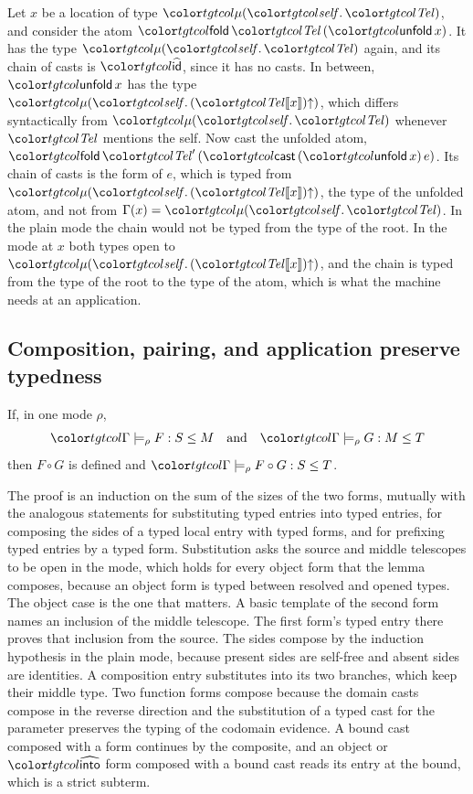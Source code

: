 \begin{example}
Let $x$ be a location of type $\obj{\tel}$, and consider the atom $\ev{fold}\,\tel\,(\ev{unfold}\,x)$. It has the type $\obj{\tel}$ again, and its chain of casts is $\form{id}$, since it has no casts. In between, $\ev{unfold}\,x$ has the type $\obj{\weak{(\inst{\tel}{x})}}$, which differs syntactically from $\obj{\tel}$ whenever $\tel$ mentions the self. Now cast the unfolded atom, $\ev{fold}\,\tel'\,(\ev{cast}\,(\ev{unfold}\,x)\,e)$. Its chain of casts is the form of $e$, which is typed from $\obj{\weak{(\inst{\tel}{x})}}$, the type of the unfolded atom, and not from $\Gamma(x) = \obj{\tel}$. In the plain mode the chain would not be typed from the type of the root. In the mode at $x$ both types open to $\obj{\weak{(\inst{\tel}{x})}}$, and the chain is typed from the type of the root to the type of the atom, which is what the machine needs at an application.
\end{example}

\subsection{Composition, pairing, and application preserve typedness}

\begin{lemma}[Composition]\label{lem:combine}
If, in one mode $\rho$,
\[ \chainj{\Gamma}{\rho}{F}{S}{M} \quad\text{and}\quad \chainj{\Gamma}{\rho}{G}{M}{T} \]
then $F \circ G$ is defined and $\chainj{\Gamma}{\rho}{F \circ G}{S}{T}$.
\end{lemma}

The proof is an induction on the sum of the sizes of the two forms, mutually with the analogous statements for substituting typed entries into typed entries, for composing the sides of a typed local entry with typed forms, and for prefixing typed entries by a typed form. Substitution asks the source and middle telescopes to be open in the mode, which holds for every object form that the lemma composes, because an object form is typed between resolved and opened types. The object case is the one that matters. A basic template of the second form names an inclusion of the middle telescope. The first form's typed entry there proves that inclusion from the source. The sides compose by the induction hypothesis in the plain mode, because present sides are self-free and absent sides are identities. A composition entry substitutes into its two branches, which keep their middle type. Two function forms compose because the domain casts compose in the reverse direction and the substitution of a typed cast for the parameter preserves the typing of the codomain evidence. A bound cast composed with a form continues by the composite, and an object or $\form{into}$ form composed with a bound cast reads its entry at the bound, which is a strict subterm.

